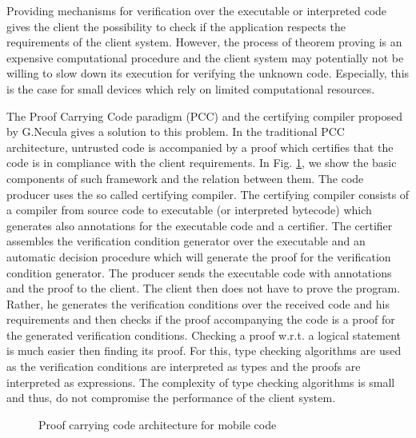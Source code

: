 Providing mechanisms for verification over the executable or interpreted code gives the client the possibility to check if the application respects the requirements of the client system.
However, the process of theorem proving is an expensive computational procedure and  the client system may potentially not be willing to 
slow down its execution for verifying the unknown code.
Especially, this is the case for small devices which rely on limited computational resources. 

 The Proof Carrying Code paradigm (PCC) and the certifying compiler proposed by G.Necula \cite{DesNecLee98} gives a solution to this problem. In the traditional PCC architecture, untrusted code is accompanied by a proof which certifies that the code is in compliance with the client  requirements. In Fig. \ref{intro:PCC}, we show  the basic components of such framework and the relation between them. The code producer uses the so called certifying compiler. The certifying compiler consists of a compiler from source code
to executable (or interpreted bytecode) which generates also annotations for the executable code  and a certifier. The certifier assembles the verification condition generator
over the executable and an automatic decision procedure which will generate the proof for the verification condition generator. The producer sends the 
executable code with annotations  and the proof to the client.
The client then does not have to prove the program. Rather, he generates the verification conditions over the received code  and his requirements and
then checks if  the proof accompanying the code is a proof for the generated verification conditions. Checking a proof w.r.t. a logical statement is much easier then finding  
its proof.  For this, type checking algorithms are used as  the verification conditions are interpreted as types and the proofs are interpreted as expressions. 
The complexity of type checking algorithms is small and thus, do not compromise  the performance of the client system.
\begin{figure}[ht!]
\begin{center}
\caption{\sc Proof carrying code architecture for mobile code}
\label{intro:PCC}
\end{center}
\end{figure}



